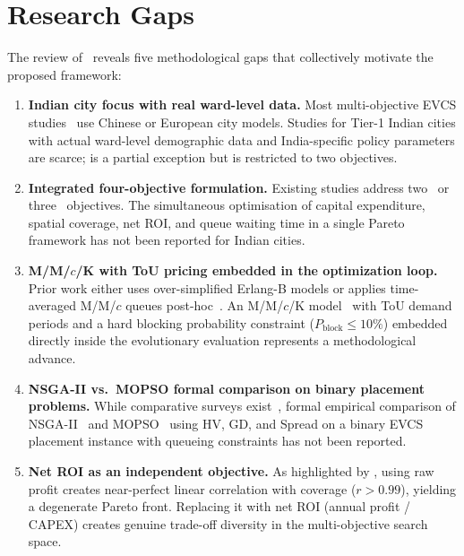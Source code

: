 \section{Research Gaps}
\label{sec:lit_gaps}

The review of~\cite{palka_planning_2025,wang_deadline_2025,zhao_optimal_2023,
li_joint_2022,xia_grid_2022,kulkarni_bass_2021,paul_nsga2_2021,
bernardo_density_2021,zhang_mmck_2019,tan_tou_2016,sadeghi_fast_2014,
reyes_sierra_2006,coello_mopso_2002,deb_nsga2_2002} reveals five
methodological gaps that collectively motivate the proposed framework:

\begin{enumerate}
  \item \textbf{Indian city focus with real ward-level data.} Most
        multi-objective EVCS studies~\cite{zhao_optimal_2023,li_joint_2022,
        xia_grid_2022} use Chinese or European city models. Studies for
        Tier-1 Indian cities with actual ward-level demographic data and
        India-specific policy parameters are scarce; \citet{paul_nsga2_2021}
        is a partial exception but is restricted to two objectives.

  \item \textbf{Integrated four-objective formulation.} Existing studies
        address two~\cite{paul_nsga2_2021} or three~\cite{zhao_optimal_2023}
        objectives. The simultaneous optimisation of capital expenditure,
        spatial coverage, net ROI, and queue waiting time in a single Pareto
        framework has not been reported for Indian cities.

  \item \textbf{M/M/$c$/K with ToU pricing embedded in the optimization loop.}
        Prior work either uses over-simplified Erlang-B models or applies
        time-averaged M/M/$c$ queues post-hoc~\cite{tan_tou_2016}. An
        M/M/$c$/K model~\cite{zhang_mmck_2019} with ToU demand periods and a
        hard blocking probability constraint ($P_{\text{block}} \leq 10\%$)
        embedded directly inside the evolutionary evaluation represents a
        methodological advance.

  \item \textbf{NSGA-II vs.\ MOPSO formal comparison on binary placement
        problems.} While comparative surveys exist~\cite{reyes_sierra_2006},
        formal empirical comparison of NSGA-II~\cite{deb_nsga2_2002} and
        MOPSO~\cite{coello_mopso_2002} using HV, GD, and Spread on a binary
        EVCS placement instance with queueing constraints has not been
        reported.

  \item \textbf{Net ROI as an independent objective.} As highlighted by
        \citet{li_joint_2022}, using raw profit creates near-perfect linear
        correlation with coverage ($r > 0.99$), yielding a degenerate Pareto
        front. Replacing it with net ROI (annual profit / CAPEX) creates
        genuine trade-off diversity in the multi-objective search space.
\end{enumerate}

